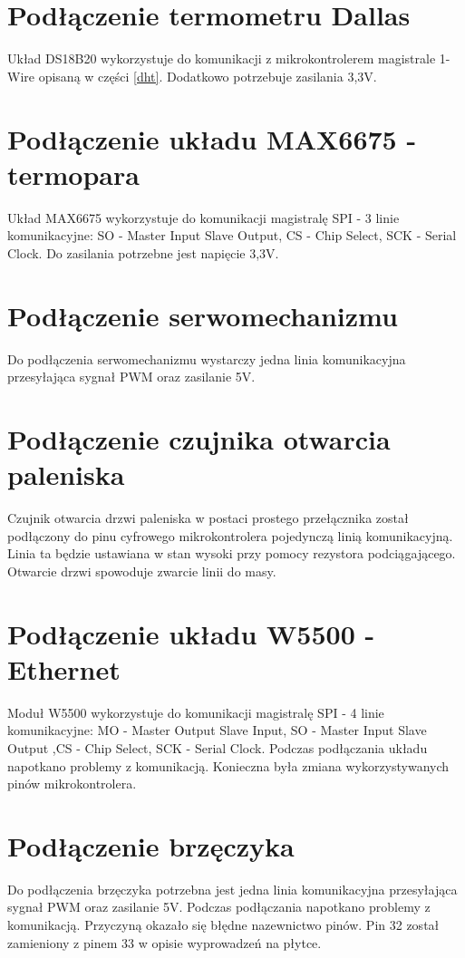 \documentclass[11pt]{report}
\begin{document}
 \section{Podłączenie termometru Dallas}
 Układ DS18B20 wykorzystuje do komunikacji z mikrokontrolerem magistrale 1-Wire opisaną w części \ref{dht}. Dodatkowo potrzebuje zasilania 3,3V.
 
 \section{Podłączenie układu MAX6675 - termopara}
 Układ MAX6675 wykorzystuje do komunikacji magistralę SPI - 3 linie komunikacyjne: SO - Master Input Slave Output, CS - Chip Select, SCK - Serial Clock. Do zasilania potrzebne jest napięcie 3,3V.
 
 \section{Podłączenie serwomechanizmu}
 Do podłączenia serwomechanizmu wystarczy jedna linia komunikacyjna przesyłająca sygnał PWM oraz zasilanie 5V.
 
 \section{Podłączenie czujnika otwarcia paleniska}
 Czujnik otwarcia drzwi paleniska w postaci prostego przełącznika został podłączony do pinu cyfrowego mikrokontrolera pojedynczą linią komunikacyjną. Linia ta będzie ustawiana w stan wysoki przy pomocy rezystora podciągającego. Otwarcie drzwi spowoduje zwarcie linii do masy. 
 
  \section{Podłączenie układu W5500 - Ethernet}
 Moduł W5500 wykorzystuje do komunikacji magistralę SPI - 4 linie komunikacyjne: MO - Master Output Slave Input, SO - Master Input Slave Output ,CS - Chip Select, SCK - Serial Clock.
 Podczas podłączania układu napotkano problemy z komunikacją. Konieczna była zmiana wykorzystywanych pinów mikrokontrolera.
 
 \section{Podłączenie brzęczyka}
 Do podłączenia brzęczyka potrzebna jest jedna linia komunikacyjna przesyłająca sygnał PWM oraz zasilanie 5V. Podczas podłączania napotkano problemy z komunikacją. Przyczyną okazało się błędne nazewnictwo pinów. Pin 32 został zamieniony z pinem 33 w opisie wyprowadzeń na płytce.
 
\end{document}
